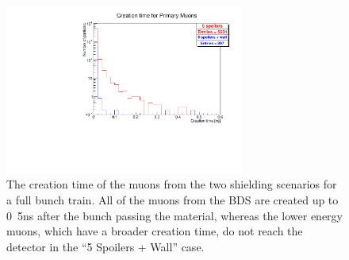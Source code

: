 \begin{figure}
    \centering
    \includegraphics[width=0.7\textwidth]{figures/muon_creationtime.pdf}
    \caption[Creation time of the muons]{
    The creation time of the muons from the two shielding scenarios for a full bunch train.
    All of the muons from the BDS are created up to \unit{0.5}{ns} after the bunch passing the material, whereas the lower energy muons, which have a broader creation time, do not reach the detector in the ``5 Spoilers + Wall'' case.
    }
    \label{fig:Creation_time}
\end{figure}
